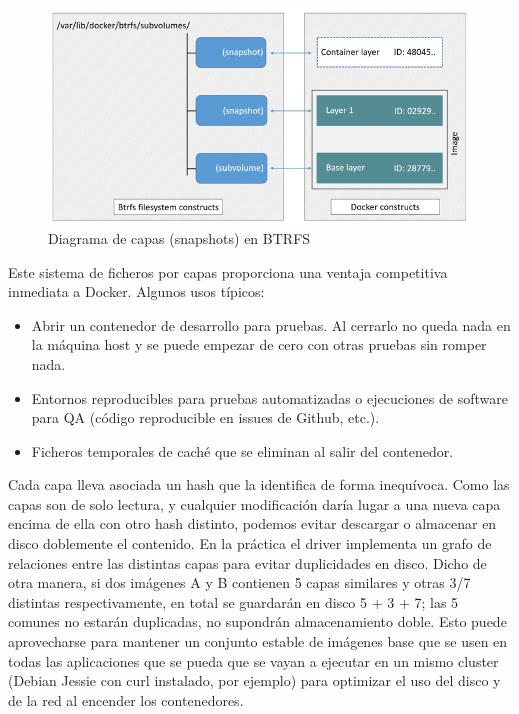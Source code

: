 \begin{figure}[H]
    \centering
    \includegraphics[width=\textwidth]{../images/docker/btrfs-layers.jpg}
    \caption{Diagrama de capas (snapshots) en BTRFS \protect\cite{dockerbtrfs}}
    \label{fig:docker-btrfs-layers}
\end{figure}

Este sistema de ficheros por capas proporciona una ventaja competitiva inmediata a Docker. Algunos usos típicos:
\begin{itemize}
    \item Abrir un contenedor de desarrollo para pruebas. Al cerrarlo no queda nada en la máquina host y se puede empezar de cero con otras pruebas sin romper nada.
    \item Entornos reproducibles para pruebas automatizadas o ejecuciones de software para QA (código reproducible en issues de Github, etc.).
    \item Ficheros temporales de caché que se eliminan al salir del contenedor.
\end{itemize}

Cada capa lleva asociada un hash que la identifica de forma inequívoca. Como las capas son de solo lectura, y cualquier modificación daría lugar a una nueva capa encima de ella con otro hash distinto, podemos evitar descargar o almacenar en disco doblemente el contenido. En la práctica el driver implementa un grafo de relaciones entre las distintas capas para evitar duplicidades en disco. Dicho de otra manera, si dos imágenes A y B contienen 5 capas similares y otras 3/7 distintas respectivamente, en total se guardarán en disco 5 + 3 + 7; las 5 comunes no estarán duplicadas, no supondrán almacenamiento doble. Esto puede aprovecharse para mantener un conjunto estable de imágenes base que se usen en todas las aplicaciones que se pueda que se vayan a ejecutar en un mismo cluster (Debian Jessie con curl instalado, por ejemplo) para optimizar el uso del disco y de la red al encender los contenedores.

